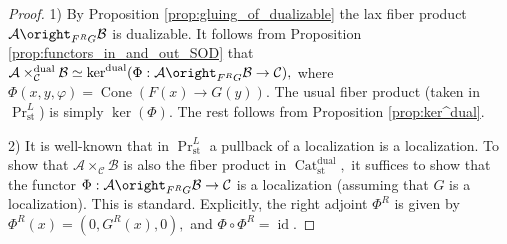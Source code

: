 \documentclass[11pt,leqno]{amsart}
\newtheorem{prop}[theo]{Proposition}
\numberwithin{equation}{section}
\newcommand{\Cat}{\operatorname{Cat}}
\newcommand{\Cone}{\operatorname{Cone}}
\newcommand{\st}{\operatorname{st}}
\newcommand{\dual}{\operatorname{dual}}
\newcommand{\cD}{{\mathcal D}}
\newcommand{\cA}{{\mathcal A}}
\newcommand{\cB}{{\mathcal B}}
\newcommand{\cC}{{\mathcal C}}
\newcommand{\cE}{{\mathcal E}}
\newcommand{\id}{\operatorname{id}}
\begin{document}
\begin{proof}1) By Proposition \ref{prop:gluing_of_dualizable} the lax fiber product $\cA\oright_{F^R G}\cB$ is dualizable. It follows from Proposition \ref{prop:functors_in_and_out_SOD} that $\cA\times^{\dual}_{\cC}\cB\simeq\ker^{\dual}(\Phi:\cA\oright_{F^R G}\cB\to \cC),$ where $\Phi(x,y,\varphi)=\Cone(F(x)\to G(y)).$ The usual fiber product (taken in $\Pr^L_{\st}$) is simply $\ker(\Phi).$ The rest follows from Proposition \ref{prop:ker^dual}.

2) It is well-known that in $\Pr^L_{\st}$ a pullback of a localization is a localization. To show that $\cA\times_{\cC}\cB$ is also the fiber product in $\Cat_{\st}^{\dual},$ it suffices to show that the functor $\Phi:\cA\oright_{F^R G}\cB\to \cC$ is a localization (assuming that $G$ is a localization). This is standard. Explicitly, the right adjoint $\Phi^R$ is given by $\Phi^R(x)=(0,G^R(x),0),$ and $\Phi\circ\Phi^R=\id.$\end{proof}





\end{document}
